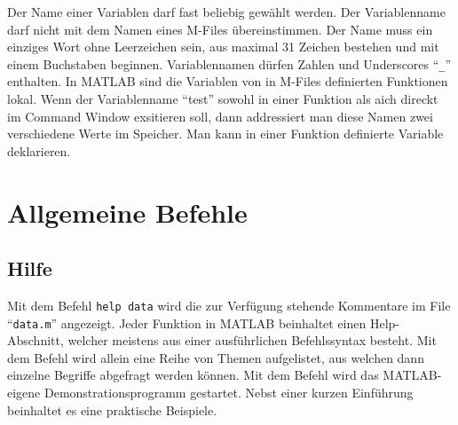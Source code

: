 \newline\newline
Der Name einer Variablen darf fast beliebig gewählt werden. Der Variablenname darf nicht mit dem Namen eines M-Files übereinstimmen. Der Name muss ein einziges Wort ohne Leerzeichen sein, aus maximal 31 Zeichen bestehen und mit einem Buchstaben beginnen. Variablennamen dürfen Zahlen und Underscores ``{\color{red}\texttt{\_}}'' enthalten. In MATLAB sind die Variablen von in M-Files definierten Funktionen lokal. Wenn der Variablenname ``test'' sowohl in einer Funktion als aich direckt im Command Window exsitieren soll, dann addressiert man diese Namen zwei verschiedene Werte im Speicher. Man kann in einer Funktion definierte Variable  deklarieren.
\section{Allgemeine Befehle}
\subsection{Hilfe}
Mit dem Befehl {\color{red}\texttt{help data}} wird die zur Verfügung stehende Kommentare im File ``\texttt{data.m}'' angezeigt. Jeder Funktion in MATLAB beinhaltet einen Help-Abschnitt, welcher meistens aus einer ausführlichen Befehlssyntax besteht.
\newline\newline
Mit dem Befehl  wird allein eine Reihe von Themen aufgelistet, aus welchen dann einzelne Begriffe abgefragt werden können.
\newline\newline
Mit dem Befehl  wird das MATLAB-eigene Demonstrationsprogramm gestartet. Nebst einer kurzen Einführung beinhaltet es eine praktische Beispiele.
\newline\newline
